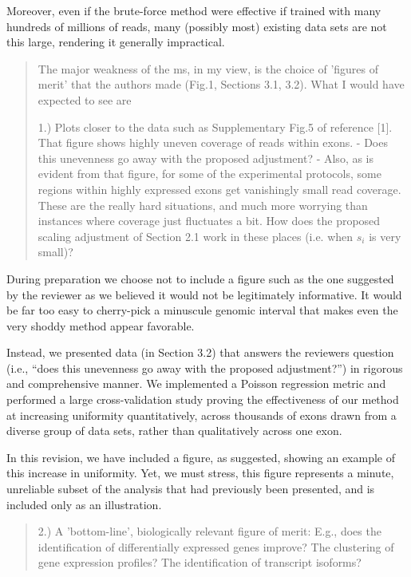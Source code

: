 \documentclass{article}
\begin{document}
Moreover, even if the brute-force method were effective if trained with many
hundreds of millions of reads, many (possibly most) existing data sets are not
this large, rendering it generally impractical.


\begin{quote}
The major weakness of the ms, in my view, is the choice of 'figures of
merit' that the authors made (Fig.1, Sections 3.1, 3.2). What I would
have expected to see are

1.) Plots closer to the data such as Supplementary Fig.5 of
reference [1]. That figure shows highly uneven coverage of reads
within exons.
- Does this unevenness go away with the proposed adjustment?
- Also, as is evident from that figure, for some of the experimental
protocols, some regions within highly expressed exons get vanishingly
small read coverage.  These are the really hard situations, and much
more worrying than instances where coverage just fluctuates a bit.
How does the proposed scaling adjustment of Section 2.1 work in these
places (i.e. when $s_{i}$ is very small)?
\end{quote}

During preparation we choose not to include a figure such as the one suggested
by the reviewer as we believed it would not be legitimately informative. It
would be far too easy to cherry-pick a minuscule genomic interval that makes
even the very shoddy method appear favorable.

Instead, we presented data (in Section 3.2) that answers the reviewers question
(i.e., ``does this unevenness go away with the proposed adjustment?'') in
rigorous and comprehensive manner. We implemented a Poisson regression metric
and performed a large cross-validation study proving the effectiveness of our
method at increasing uniformity quantitatively, across thousands of exons drawn
from a diverse group of data sets, rather than qualitatively across one exon.

In this revision, we have included a figure, as suggested, showing an example of
this increase in uniformity. Yet, we must stress, this figure represents a
minute, unreliable subset of the analysis that had previously been presented,
and is included only as an illustration.


\begin{quote}
2.) A 'bottom-line', biologically relevant figure of merit: E.g., does
the identification of differentially expressed genes improve? The
clustering of gene expression profiles? The identification of
transcript isoforms?
\end{quote}
\end{document}
